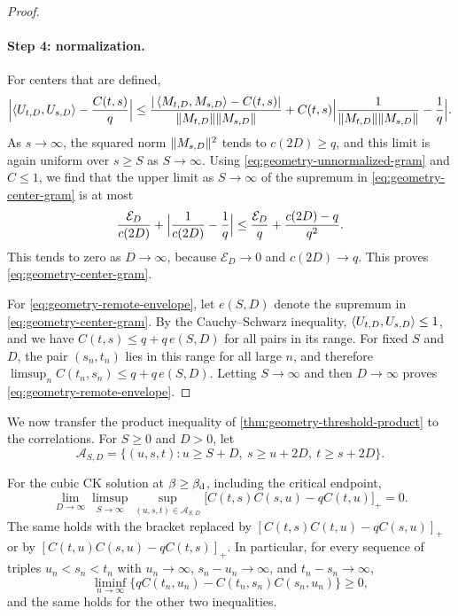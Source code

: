 \begin{proof}
\paragraph{Step 4: normalization.}
For centers that are defined,
\[
 \Bigl|\left\langle U_{t,D},U_{s,D}\right\rangle-\frac{C(t,s)}q\Bigr|
 \le\frac{|\left\langle M_{t,D},M_{s,D}\right\rangle-C(t,s)|}{\lVert M_{t,D}\rVert\lVert M_{s,D}\rVert}
 +C(t,s)\Bigl|\frac1{\lVert M_{t,D}\rVert\lVert M_{s,D}\rVert}-\frac1q\Bigr| .
\]
As $s\to\infty$, the squared norm $\lVert M_{s,D}\rVert^2$ tends to $c(2D)\ge q$, and this limit is again uniform over $s\ge S$ as $S\to\infty$. Using \eqref{eq:geometry-unnormalized-gram} and $C\le1$, we find that the upper limit as $S\to\infty$ of the supremum in \eqref{eq:geometry-center-gram} is at most
\[
 \frac{\mathcal E_D}{c(2D)}+\Bigl|\frac1{c(2D)}-\frac1q\Bigr|\le\frac{\mathcal E_D}q+\frac{c(2D)-q}{q^2} .
\]
This tends to zero as $D\to\infty$, because $\mathcal E_D\to0$ and $c(2D)\to q$. This proves \eqref{eq:geometry-center-gram}.

For \eqref{eq:geometry-remote-envelope}, let $e(S,D)$ denote the supremum in \eqref{eq:geometry-center-gram}. By the Cauchy--Schwarz inequality, $\left\langle U_{t,D},U_{s,D}\right\rangle\le1$, and we have $C(t,s)\le q+q\,e(S,D)$ for all pairs in its range. For fixed $S$ and $D$, the pair $(s_n,t_n)$ lies in this range for all large $n$, and therefore $\limsup_nC(t_n,s_n)\le q+q\,e(S,D)$. Letting $S\to\infty$ and then $D\to\infty$ proves \eqref{eq:geometry-remote-envelope}.
\end{proof}

We now transfer the product inequality of \cref{thm:geometry-threshold-product} to the correlations. For $S\ge0$ and $D>0$, let
\[
 \mathcal A_{S,D}=\{(u,s,t):u\ge S+D,\ s\ge u+2D,\ t\ge s+2D\}.
\]

\begin{theorem}
\label{thm:geometry-actual-product}
For the cubic CK solution at $\beta\ge\beta_{\mathrm d}$, including the critical endpoint,
\begin{equation}
 \lim_{D\to\infty}\limsup_{S\to\infty}
 \sup_{(u,s,t)\in\mathcal A_{S,D}}
 \bigl[C(t,s)C(s,u)-qC(t,u)\bigr]_+=0 .
 \label{eq:geometry-actual-product}
\end{equation}
The same holds with the bracket replaced by $[C(t,s)C(t,u)-qC(s,u)]_+$ or by $[C(t,u)C(s,u)-qC(t,s)]_+$. In particular, for every sequence of triples $u_n<s_n<t_n$ with $u_n\to\infty$, $s_n-u_n\to\infty$, and $t_n-s_n\to\infty$,
\begin{equation}\label{eq:geometry-actual-product-sequences}
 \liminf_{n\to\infty}\bigl\{qC(t_n,u_n)-C(t_n,s_n)C(s_n,u_n)\bigr\}\ge0,
\end{equation}
and the same holds for the other two inequalities.
\end{theorem}

